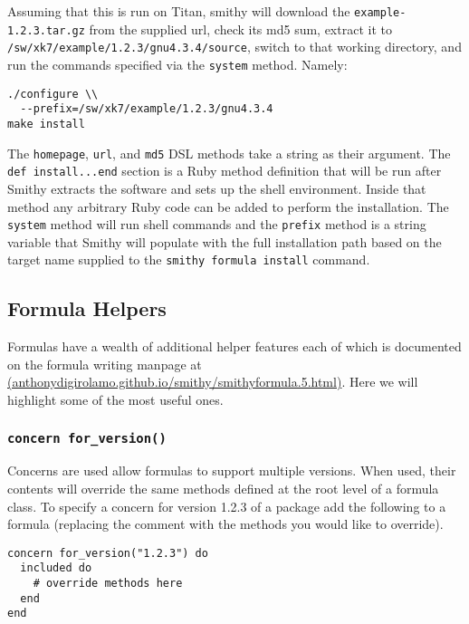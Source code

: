 \documentclass{acm_proc_article-sp}
\begin{document}
Assuming that this is run on Titan, smithy will download the
\texttt{example-1.2.3.tar.gz} from the supplied url, check its md5 sum, extract
it to \texttt{/sw/xk7/example/1.2.3/gnu4.3.4/source}, switch to that working
directory, and run the commands specified via the \texttt{system} method.
Namely:

\begin{quoting}
\begin{verbatim}
./configure \\
  --prefix=/sw/xk7/example/1.2.3/gnu4.3.4
make install
\end{verbatim}
\end{quoting}

The \texttt{homepage}, \texttt{url}, and \texttt{md5} DSL methods take a string
as their argument. The \texttt{def install...end} section is a Ruby method
definition that will be run after Smithy extracts the software and sets up the
shell environment. Inside that method any arbitrary Ruby code can be added to
perform the installation. The \texttt{system} method will run shell commands and
the \texttt{prefix} method is a string variable that Smithy will populate with
the full installation path based on the target name supplied to the
\texttt{smithy formula install} command.

\subsection{Formula Helpers}

Formulas have a wealth of additional helper features each of which is documented
on the formula writing manpage at \\
\href{http://anthonydigirolamo.github.io/smithy/smithyformula.5.html}{(anthonydigirolamo.github.io/smithy/smithyformula.5.html)}.
Here we will highlight some of the most useful ones.

\subsubsection{\texttt{concern for\_version()}}

Concerns are used allow formulas to support multiple versions. When used, their
contents will override the same methods defined at the root level of a formula
class. To specify a concern for version 1.2.3 of a package add the following to
a formula (replacing the comment with the methods you would like to override).

\begin{quoting}
\begin{verbatim}
concern for_version("1.2.3") do
  included do
    # override methods here
  end
end
\end{verbatim}
\end{quoting}
\end{document}
